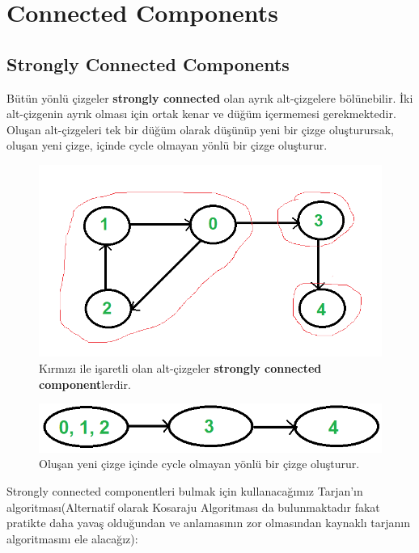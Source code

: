 \documentclass[12pt]{article}
\begin{document}
	\cleardoublepage

    \section{Connected Components}
    \subsection{Strongly Connected Components}
   Bütün yönlü çizgeler \textbf{strongly connected} olan ayrık alt-çizgelere bölünebilir. İki alt-çizgenin ayrık olması için ortak kenar ve düğüm içermemesi gerekmektedir. Oluşan alt-çizgeleri tek bir düğüm olarak düşünüp yeni bir çizge oluşturursak, oluşan yeni çizge, içinde cycle olmayan yönlü bir çizge oluşturur.
\begin{figure}[H]
\centering
\includegraphics[width=\linewidth/2]{SCC.png}
\caption{Kırmızı ile işaretli olan alt-çizgeler \textbf{strongly connected component}lerdir.}
\label{fig:prime1}
\end{figure}

\begin{figure}[H]
\centering
\includegraphics[width=\linewidth/2]{SCCGraph.png}
\caption{Oluşan yeni çizge içinde cycle olmayan yönlü bir çizge oluşturur.}
\label{fig:prime1}
\end{figure}

Strongly connected componentleri bulmak için kullanacağımız Tarjan'ın algoritması(Alternatif olarak Kosaraju Algoritması da bulunmaktadır fakat pratikte daha yavaş olduğundan ve anlamasının zor olmasından kaynaklı tarjanın algoritmasını ele alacağız):
\end{document}
